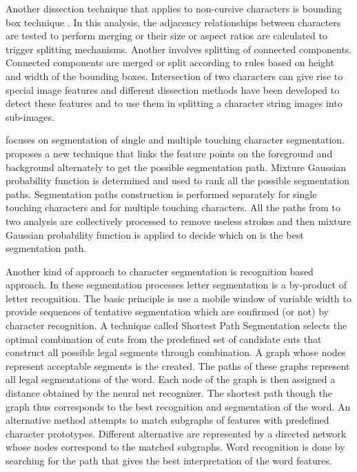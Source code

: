 Another dissection technique that applies to non-cursive characters
is bounding box technique \cite{CaseyLecolinet1996}. In this
analysis, the adjacency relationships between characters are tested
to perform merging or their size or aspect ratios are calculated to
trigger splitting mechanisms.  Another involves splitting of
connected components. Connected components are merged or split
according to rules based on height and width of the bounding boxes.
Intersection of two characters can give rise to special image
features and different dissection methods have been developed to
detect these features and to use them in splitting a character
string images into sub-images.

\cite{chen2000sso} focuses on segmentation of single and multiple
touching character segmentation. \cite{chen2000sso} proposes a new
technique that links the feature points on the foreground and
background alternately to get the possible segmentation path.
Mixture Gaussian probability function is determined and used to rank
all the possible segmentation paths. Segmentation paths construction
is performed separately for single touching characters and for
multiple touching characters. All the paths from to two analysis are
collectively processed to remove useless strokes and then mixture
Gaussian probability function is applied to decide which on is the
best segmentation path.

Another kind of approach to character segmentation is recognition
based approach. In these segmentation processes letter segmentation
is a by-product of letter recognition. The basic principle is use a
mobile window of variable width to provide sequences of tentative
segmentation which are confirmed (or not) by character recognition.
A technique called Shortest Path Segmentation selects the optimal
combination of cuts from the predefined set of candidate cuts that
construct all possible legal segments through combination. A graph
whose nodes represent acceptable segments is the created. The paths
of these graphs represent all legal segmentations of the word. Each
node of the graph is then assigned a distance obtained by the neural
net recognizer. The shortest path though the graph thus corresponds
to the best recognition and segmentation of the word. An alternative
method attempts to match subgraphs of features with predefined
character prototypes. Different alternative are represented by a
directed network whose nodes correspond to the matched subgraphs.
Word recognition is done by searching for the path that gives the
best interpretation of the word features.

